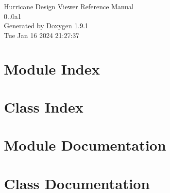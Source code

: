 \documentclass[a4paper]{asimbook}
\begin{document}
   \begin{titlepage}
     \vspace*{7cm}
     \begin{center}
     {\Large Hurricane Design Viewer Reference Manual\\[1ex]\large 0..\+0a1 }\\
     \vspace*{1cm}
     {\large Generated by Doxygen 1.9.1}\\
     \vspace*{0.5cm}
     {\small Tue Jan 16 2024 21:27:37}\\
     \end{center}
   \end{titlepage}

   \clearemptydoublepage

   \tableofcontents
   \clearemptydoublepage

\chapter{Module Index}

\chapter{Class Index}

\chapter{Module Documentation}

\chapter{Class Documentation}








\backmatter
\newpage
{}
\clearemptydoublepage
{}
\printindex
\end{document}
